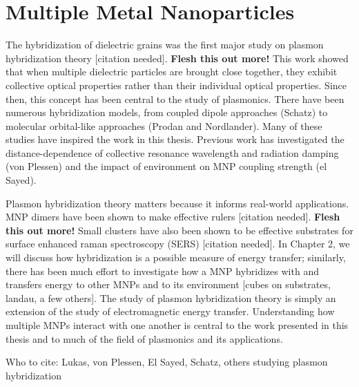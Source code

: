 \documentclass [11pt, proquest] {uwthesis}[2016/11/22]
\begin{document}
\section{Multiple Metal Nanoparticles}

The hybridization of dielectric grains was the first major study on plasmon hybridization theory [citation needed]. {\bf Flesh this out more!} This work showed that when multiple dielectric particles are brought close together, they exhibit collective optical properties rather than their individual optical properties. Since then, this concept has been central to the study of plasmonics. There have been numerous hybridization models, from coupled dipole approaches (Schatz) to molecular orbital-like approaches (Prodan and Nordlander). Many of these studies have inspired the work in this thesis. Previous work has investigated the distance-dependence of collective resonance wavelength and radiation damping (von Plessen) and the impact of environment on MNP coupling strength (el Sayed).

Plasmon hybridization theory matters because it informs real-world applications. MNP dimers have been shown to make effective rulers [citation needed]. {\bf Flesh this out more!} Small clusters have also been shown to be effective substrates for surface enhanced raman spectroscopy (SERS) [citation needed]. In Chapter 2, we will discuss how hybridization is a possible measure of energy transfer; similarly, there has been much effort to investigate how a MNP hybridizes with and transfers energy to other MNPs and to its environment [cubes on substrates, landau, a few others]. The study of plasmon hybridization theory is simply an extension of the study of electromagnetic energy transfer. Understanding how multiple MNPs interact with one another is central to the work presented in this thesis and to much of the field of plasmonics and its applications.

Who to cite: Lukas, von Plessen, El Sayed, Schatz, others studying plasmon hybridization
\end{document}
